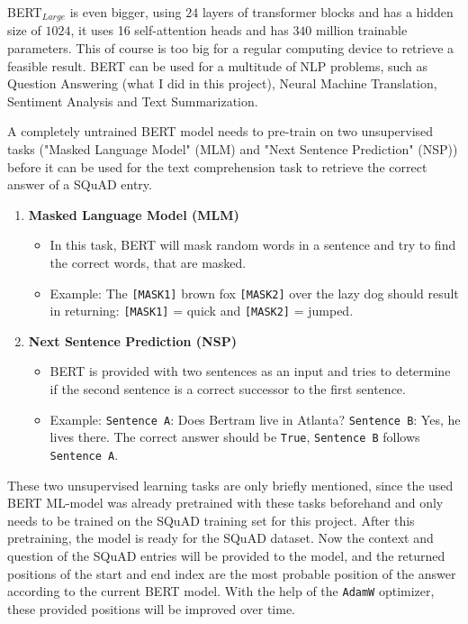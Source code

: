         BERT$_{Large}$ is even bigger, using $24$ layers of transformer blocks and has a hidden size of $1024$, it uses 16 self-attention heads and has $340$ million trainable parameters. This of course is too big for a regular computing device to retrieve a feasible result.
        BERT can be used for a multitude of NLP problems, such as Question Answering (what I did in this project), Neural Machine Translation, Sentiment Analysis and Text Summarization.
   

        A completely untrained BERT model needs to pre-train on two unsupervised tasks ("Masked Language Model" (MLM) and "Next Sentence Prediction" (NSP)) before it can be used for the text comprehension task to retrieve the correct answer of a SQuAD entry. 
        
        \begin{enumerate}
            \item \textbf{Masked Language Model (MLM)}
            \begin{itemize}
                \item In this task, BERT will mask random words in a sentence and try to find the correct words, that are masked.
                \item Example: The \texttt{[MASK1]} brown fox \texttt{[MASK2]} over the lazy dog should result in returning: \texttt{[MASK1]} = quick and \texttt{[MASK2]} = jumped.
            \end{itemize}

            \item \textbf{Next Sentence Prediction (NSP)}
            \begin{itemize}
                \item BERT is provided with two sentences as an input and tries to determine if the second sentence is a correct successor to the first sentence.
                \item Example: \texttt{Sentence A}: Does Bertram live in Atlanta? \texttt{Sentence B}: Yes, he lives there. The correct answer should be \texttt{True}, \texttt{Sentence B} follows \texttt{Sentence A}.
            \end{itemize}
        \end{enumerate}
        These two unsupervised learning tasks are only briefly mentioned, since the used BERT ML-model was already pretrained with these tasks beforehand and only needs to be trained on the SQuAD training set for this project.
        After this pretraining, the model is ready for the SQuAD dataset.
        Now the context and question of the SQuAD entries will be provided to the model, and the returned positions of the start and end index are the most probable position of the answer according to the current BERT model.
        With the help of the \texttt{AdamW} optimizer, these provided positions will be improved over time. 

